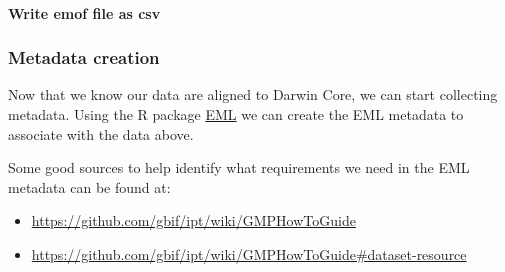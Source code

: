 \documentclass[
]{book}
\newenvironment{Shaded}{\begin{snugshade}}{\end{snugshade}}
\newcommand{\AttributeTok}[1]{\textcolor[rgb]{0.77,0.63,0.00}{#1}}
\newcommand{\ConstantTok}[1]{\textcolor[rgb]{0.00,0.00,0.00}{#1}}
\newcommand{\FunctionTok}[1]{\textcolor[rgb]{0.00,0.00,0.00}{#1}}
\newcommand{\NormalTok}[1]{#1}
\newcommand{\OtherTok}[1]{\textcolor[rgb]{0.56,0.35,0.01}{#1}}
\newcommand{\SpecialCharTok}[1]{\textcolor[rgb]{0.00,0.00,0.00}{#1}}
\newcommand{\StringTok}[1]{\textcolor[rgb]{0.31,0.60,0.02}{#1}}
\begin{document}
\hypertarget{write-emof-file-as-csv}{%
\paragraph{Write emof file as csv}\label{write-emof-file-as-csv}}

\begin{Shaded}
\end{Shaded}

\hypertarget{metadata-creation}{%
\subsubsection{Metadata creation}\label{metadata-creation}}

Now that we know our data are aligned to Darwin Core, we can start collecting metadata. Using the R package \href{https://docs.ropensci.org/EML/}{EML} we can create the EML metadata to associate with the data above.

Some good sources to help identify what requirements we need in the EML metadata can be found at:

\begin{itemize}
\item
  \url{https://github.com/gbif/ipt/wiki/GMPHowToGuide}
\item
  \url{https://github.com/gbif/ipt/wiki/GMPHowToGuide\#dataset-resource}
\end{itemize}
\end{document}
